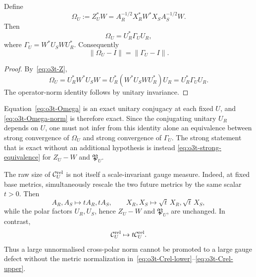 \begin{corollary}
\label{cor:o3t-Omega}
Define
\[
 \boxed{
 \Omega_U:=Z_U^*W
 =A_R^{-1/2}X_R^*W^*X_SA_S^{-1/2}W.
 }
\]
Then
\[
 \boxed{
 \Omega_U=U_R^*\Gamma_UU_R,
 }
\tag{O3T.11}\label{eq:o3t-Omega}
\]
where $\Gamma_U=W^*U_SWU_R^*$.  Consequently
\[
 \boxed{
 \|\Omega_U-I\|=\|\Gamma_U-I\|.
 }
\tag{O3T.12}\label{eq:o3t-Omega-norm}
\]
\end{corollary}

\begin{proof}
By~\eqref{eq:o3t-Z},
\[
 \Omega_U
 =U_R^*W^*U_SW
 =U_R^*(W^*U_SWU_R^*)U_R
 =U_R^*\Gamma_UU_R.
\]
The operator-norm identity follows by unitary invariance.
\end{proof}

\begin{remark}
\label{rem:o3t-Omega-strong-firewall}
Equation~\eqref{eq:o3t-Omega} is an exact unitary conjugacy at each fixed $U$, and
\eqref{eq:o3t-Omega-norm} is therefore exact.  Since the conjugating unitary $U_R$
depends on $U$, one must not infer from this identity alone an equivalence between
strong convergence of $\Omega_U$ and strong convergence of $\Gamma_U$.  The strong
statement that is exact without an additional hypothesis is instead
\eqref{eq:o3t-strong-equivalence} for $Z_U-W$ and $\mathfrak P_U$.
\end{remark}

\begin{remark}
\label{rem:o3t-scale-firewall}
The raw size of $\mathcal C_U^{\rm rel}$ is not itself a scale-invariant gauge measure.
Indeed, at fixed base metrics, simultaneously rescale the two future metrics by the
same scalar $t>0$.  Then
\[
 A_R,A_S\mapsto tA_R,tA_S,
 \qquad
 X_R,X_S\mapsto\sqrt t\,X_R,\sqrt t\,X_S,
\]
while the polar factors $U_R,U_S$, hence $Z_U-W$ and $\mathfrak P_U$, are unchanged.
In contrast,
\[
 \mathcal C_U^{\rm rel}\mapsto t\mathcal C_U^{\rm rel}.
\]
Thus a large unnormalised cross-polar norm cannot be promoted to a large gauge defect
without the metric normalization in~\eqref{eq:o3t-Crel-lower}--\eqref{eq:o3t-Crel-upper}.
\end{remark}

